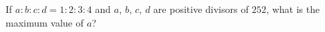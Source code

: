 If $a:b:c:d=1:2:3:4$ and $a$, $b$, $c$, $d$ are positive divisors of $252$, what is the maximum value of $a$?
